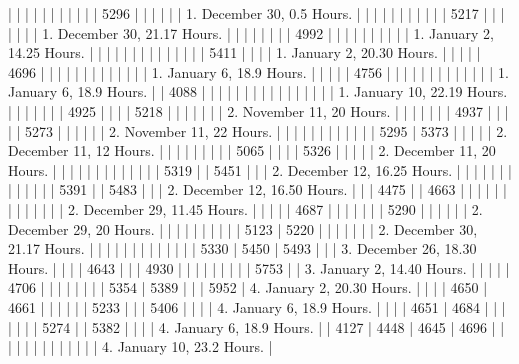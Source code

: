 \documentclass[a4paper, 12pt, oneside, polutonikogreek, english]{article}
\begin{document}
|   |   |   |   |     |   |    |   |    |    | 5296 |    |   |    |    |   | 1. December 30, 0.5 Hours.    |
|   |   |   |   |     |   |    |   |    | 5217 |    |    |   |    |    |   | 1. December 30, 21.17 Hours.   |
|   |   |   |   |     |   | 4992 |   |    |    |    |    |   |    |    |   | 1. January 2, 14.25 Hours.    |
|   |   |   |   |     |   |    |   |    |    |    |    | 5411 |    |    |   | 1. January 2, 20.30 Hours.    |
|   |   |   | 4696 |     |   |    |   |    |    |    |    |   |    |    |   | 1. January 6, 18.9 Hours.    |
|   |   |   | 4756 |     |   |    |   |    |    |    |    |   |    |    |   | 1. January 6, 18.9 Hours.    |
| 4088 |   |   |   |     |   |    |   |    |    |    |    |   |    |    |   | 1. January 10, 22.19 Hours.   |
|   |   |   |   |     | 4925 |    |   |    | 5218 |    |    |   |    |    |   | 2. November 11, 20 Hours.    |
|   |   |   |   |     | 4937 |    |   |    |    | 5273 |    |   |    |    |   | 2. November 11, 22 Hours.    |
|   |   |   |   |     |   |    |   |    |    | 5295 | 5373 |   |    |    |   | 2. December 11, 12 Hours.    |
|   |   |   |   |     |   |    | 5065 |    |    |    | 5326 |   |    |    |   | 2. December 11, 20 Hours.    |
|   |   |   |   |     |   |    |   |    |    |    | 5319 |   | 5451 |    |   | 2. December 12, 16.25 Hours.   |
|   |   |   |   |     |   |    |   |    |    |    | 5391 |   | 5483 |    |   | 2. December 12, 16.50 Hours.   |
|   | 4475 |   | 4663 |     |   |    |   |    |    |    |    |   |    |    |   | 2. December 29, 11.45 Hours.   |
|   |   |   | 4687 |     |   |    |   |    |    | 5290 |    |   |    |    |   | 2. December 29, 20 Hours.    |
|   |   |   |   |     |   |    |   | 5123 | 5220 |    |    |   |    |    |   | 2. December 30, 21.17 Hours.   |
|   |   |   |   |     |   |    |   |    |    |    | 5330 | 5450 | 5493 |    |   | 3. December 26, 18.30 Hours.   |
|   |   | 4643 |   |     | 4930 |    |   |    |    |    |    |   |    | 5753 |   | 3. January 2, 14.40 Hours.    |
|   |   |   | 4706 |     |   |    |   |    |    |    | 5354 | 5389 |    |    | 5952 | 4. January 2, 20.30 Hours.    |
|   |   | 4650 | 4661 |     |   |    |   |    | 5233 |    |    | 5406 |    |    |   | 4. January 6, 18.9 Hours.    |
|   |   | 4651 | 4684 |     |   |    |   |    |    | 5274 |    | 5382 |    |    |   | 4. January 6, 18.9 Hours.    |
| 4127 | 4448 | 4645 | 4696 |     |   |    |   |    |    |    |    |   |    |    |   | 4. January 10, 23.2 Hours.    |
\end{document}
